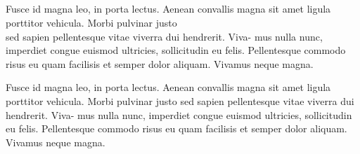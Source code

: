
\newpage \begin{appendices} 
\appendixtocon %

\appendixpage %

\subsection*{\listappendixname}
\listofappendices

\begin{subappendices}
\renewcommand{\setthesubsection}{\arabic{subsection}:}%


Fusce id magna leo, in porta lectus. Aenean convallis magna sit amet ligula
porttitor vehicula. Morbi pulvinar justo\\
sed sapien pellentesque vitae viverra dui hendrerit. Viva- mus nulla nunc,
imperdiet congue euismod ultricies, sollicitudin eu felis. Pellentesque commodo
risus eu quam facilisis et semper dolor aliquam. Vivamus neque magna.

\newpage
{}
Fusce id magna leo, in porta lectus. Aenean convallis magna sit amet ligula
porttitor vehicula. Morbi pulvinar justo sed sapien pellentesque vitae viverra
dui hendrerit. Viva- mus nulla nunc, imperdiet congue euismod ultricies,
sollicitudin eu felis. Pellentesque commodo risus eu quam facilisis et semper
dolor aliquam. Vivamus neque magna.


\end{subappendices}
\end{appendices}

